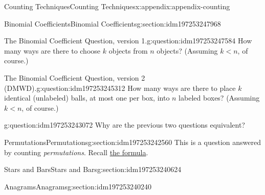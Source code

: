 \documentclass[oneside,10pt,]{book}
\numberwithin{equation}{section}
\newcommand{\lt}{<}
\begin{document}
\begin{appendixptx}{Counting Techniques}{}{Counting Techniques}{}{}{x:appendix:appendix-counting}
\begin{sectionptx}{Binomial Coefficients}{}{Binomial Coefficients}{}{}{g:section:idm197253247968}
\begin{question}{The Binomial Coefficient Question, version 1.}{g:question:idm197253247584}
How many ways are there to choose \(k\) objects from \(n\) objects? (Assuming \(k \lt n\), of course.)%
\end{question}
\begin{question}{The Binomial Coefficient Question, version 2 (DMWD).}{g:question:idm197253245312}%
How many ways are there to place \(k\) identical (unlabeled) balls, at most one per box, into \(n\) labeled boxes? (Assuming \(k \lt n\), of course.)%
\end{question}
\begin{question}{}{g:question:idm197253243072}%
Why are the previous two questions equivalent?%
\end{question}
\end{sectionptx}
%
%
\typeout{************************************************}
\typeout{************************************************}
%
\begin{sectionptx}{Permutations}{}{Permutations}{}{}{g:section:idm197253242560}
This is a question answered by counting \emph{permutations}. Recall \hyperref[x:assemblage:formula-permutations]{the formula}.%
\end{sectionptx}
%
%
\typeout{************************************************}
\typeout{************************************************}
%
\begin{sectionptx}{Stars and Bars}{}{Stars and Bars}{}{}{g:section:idm197253240624}
\end{sectionptx}
%
%
\typeout{************************************************}
\typeout{************************************************}
%
\begin{sectionptx}{Anagrams}{}{Anagrams}{}{}{g:section:idm197253240240}
\end{sectionptx}
\end{appendixptx}
%
\backmatter
%
\end{document}
